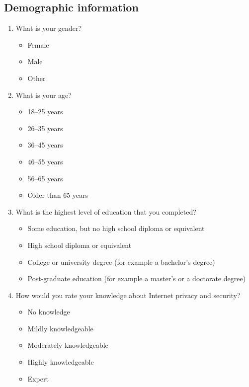 \subsection{Demographic information}
\begin{enumerate}
    \item What is your gender?
        \begin{itemize}[label=$\Circle$]
            \item Female
            \item Male
            \item Other
        \end{itemize}

    \item What is your age?
        \begin{itemize}[label=$\Circle$]
            \item 18--25 years
            \item 26--35 years
            \item 36--45 years
            \item 46--55 years
            \item 56--65 years
            \item Older than 65 years
        \end{itemize}

    \item What is the highest level of education that you completed?
        \begin{itemize}[label=$\Circle$]
            \item Some education, but no high school diploma or equivalent
            \item High school diploma or equivalent
            \item College or university degree (for example a bachelor's degree)
            \item Post-graduate education (for example a master's or a doctorate degree)
        \end{itemize}

    \item How would you rate your knowledge about Internet privacy and security?
        \begin{itemize}[label=$\Circle$]
            \item No knowledge
            \item Mildly knowledgeable
            \item Moderately knowledgeable
            \item Highly knowledgeable
            \item Expert
        \end{itemize}
\end{enumerate}

